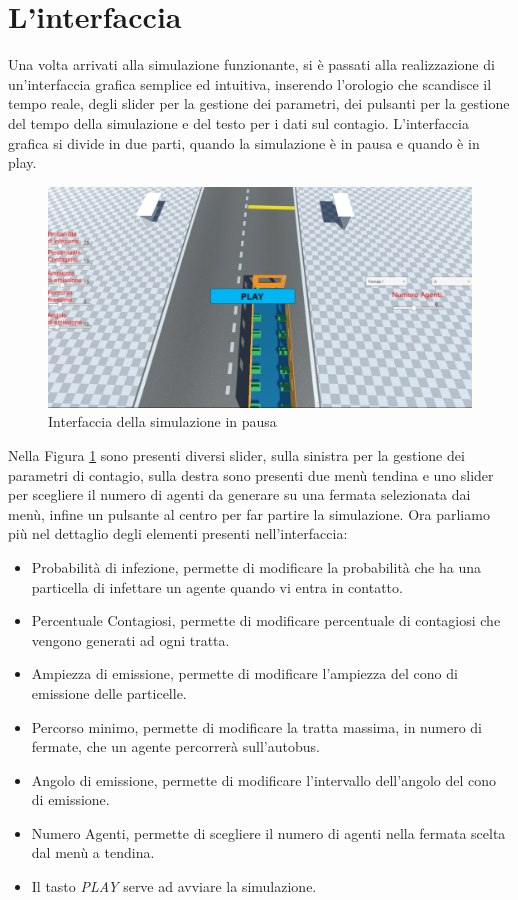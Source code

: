 \documentclass[12pt, openany]{book}
\begin{document}
 	\section{L'interfaccia}
 	Una volta arrivati alla simulazione funzionante, si è passati alla realizzazione di un'interfaccia grafica semplice ed intuitiva, inserendo l'orologio che scandisce il tempo reale, degli slider per la gestione dei parametri, dei pulsanti per la gestione del tempo della simulazione e del testo per i dati sul contagio. L'interfaccia grafica si divide in due parti, quando la simulazione è in pausa e quando è in play.
 	\begin{figure}[H]
 		\centering
 		\includegraphics[width=0.8\linewidth]{"Immagini/PausedGui.png"}
 		\caption{Interfaccia della simulazione in pausa}
 		\label{fig:InterfacciaPausa}
 	\end{figure}
 	Nella Figura \ref{fig:InterfacciaPausa} sono presenti diversi slider, sulla sinistra per la gestione dei parametri di contagio, sulla destra sono presenti due menù tendina e uno slider per scegliere il numero di agenti da generare su una fermata selezionata dai menù, infine un pulsante al centro per far partire la simulazione.
 	Ora parliamo più nel dettaglio degli elementi presenti nell'interfaccia:\\
 	\begin{itemize}
 		\item Probabilità di infezione, permette di modificare la probabilità che ha una particella di infettare un agente quando vi entra in contatto.
 		\item Percentuale Contagiosi, permette di modificare percentuale di contagiosi che vengono generati ad ogni tratta.
 		\item Ampiezza di emissione, permette di modificare l'ampiezza del cono di emissione delle particelle.
 		\item Percorso minimo, permette di modificare la tratta massima, in numero di fermate, che un agente percorrerà sull'autobus.
 		\item Angolo di emissione, permette di modificare l'intervallo dell'angolo del cono di emissione.
 		\item Numero Agenti, permette di scegliere il numero di agenti nella fermata scelta dal menù a tendina.
 		\item Il tasto \emph{PLAY} serve ad avviare la simulazione.
 	\end{itemize}
 
\end{document}
